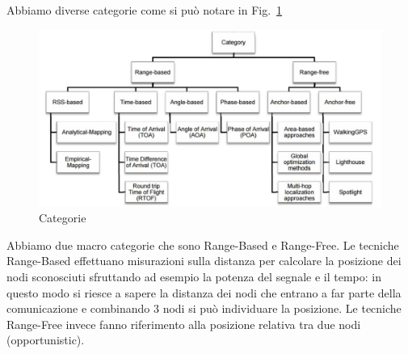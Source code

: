 Abbiamo diverse categorie come si può notare in
Fig.~\ref{fig:fig3-lec3pt1}
\begin{figure}
        \centering
        \includegraphics[scale=0.6]{fig3-lec3pt1.png}
        \caption{Categorie}
        \label{fig:fig3-lec3pt1}
\end{figure}
Abbiamo due macro categorie che sono Range-Based e Range-Free.
Le tecniche Range-Based effettuano misurazioni sulla distanza per
calcolare la posizione dei nodi sconosciuti sfruttando ad esempio la potenza del
segnale e il tempo: in questo modo si riesce a sapere la distanza dei nodi che
entrano a far parte della comunicazione e combinando 3 nodi si può individuare
la posizione. Le tecniche Range-Free invece fanno riferimento alla posizione
relativa tra due nodi (opportunistic).

